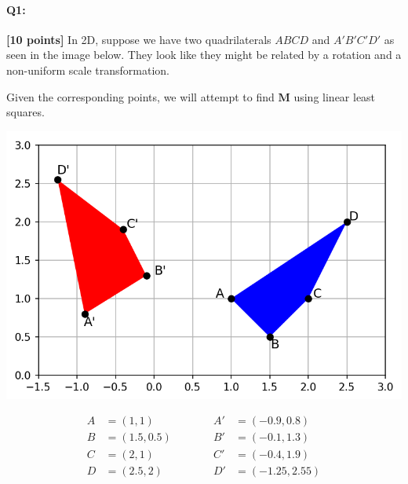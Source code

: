 \pagebreak


\paragraph{Q1:} \textbf{[10 points]}
In 2D, suppose we have two quadrilaterals $ABCD$ and $A'B'C'D'$ as seen in the image below. They look like they might be related by a rotation and a non-uniform scale transformation.

Given the corresponding points, we will attempt to find $\bm{M}$ using linear least squares.

\begin{minipage}{0.5\linewidth}
    \includegraphics[width=\linewidth]{images/quads_lstsq.png}
\end{minipage}
\begin{minipage}{0.5\linewidth}
    \begin{equation}
    \begin{split}
    A&=(1, 1)\\
    B&=(1.5, 0.5)\\
    C&=(2, 1)\\
    D&=(2.5, 2)
    \end{split}
    \quad\quad\quad
    \begin{split}
    A'&=(-0.9, 0.8)\\
    B'&=(-0.1, 1.3)\\
    C'&=(-0.4, 1.9)\\
    D'&=(-1.25, 2.55)
    \end{split}
    \end{equation}
\end{minipage}

